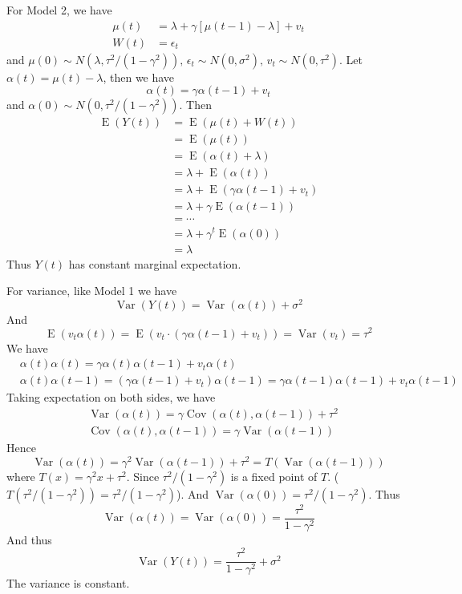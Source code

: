 \documentclass{article}
\DeclareMathOperator{\Cov}{Cov}
\DeclareMathOperator{\Var}{Var}
\DeclareMathOperator{\E}{E}
\begin{document}
\begin{enumerate}
    For Model 2, we have
	\begin{align*}
	\mu(t) & = \lambda + \gamma[\mu(t-1) - \lambda] + v_t\\
	W(t) & = \epsilon_t
	\end{align*}
	and $\mu(0) \sim N(\lambda, \tau^2/(1 - \gamma^2)),\, \epsilon_t \sim N(0, \sigma^2),\, v_t \sim N(0, \tau^2)$.
	Let $\alpha(t) = \mu(t) - \lambda$, then we have
	\[\alpha(t) = \gamma \alpha(t-1) + v_t\]
	and $\alpha(0) \sim N(0, \tau^2/(1 - \gamma^2))$. Then
	\begin{align*}
	\E(Y(t)) & = \E(\mu(t) + W(t))\\
	& = \E(\mu(t))\\
	& = \E(\alpha(t) + \lambda)\\
	& = \lambda + \E(\alpha(t))\\
	& = \lambda + \E(\gamma \alpha(t-1) + v_t)\\
	& = \lambda + \gamma\E(\alpha(t-1))\\
	& = \cdots\\
	& = \lambda + \gamma^t \E(\alpha(0))\\
	& = \lambda 
	\end{align*}
	Thus $Y(t)$ has constant marginal expectation.

	For variance, like Model 1 we have
	\[\Var(Y(t)) = \Var(\alpha(t)) + \sigma^2\]
	And
	\[\E(v_t \alpha(t)) = \E(v_t \cdot (\gamma \alpha(t-1) + v_t)) = \Var(v_t) = \tau^2\]
	We have
	\begin{align*}
	&\alpha(t) \alpha(t) = \gamma \alpha(t) \alpha(t-1) + v_t \alpha(t)\\
	& \alpha(t) \alpha(t-1) = (\gamma \alpha(t-1) + v_t) \alpha(t-1) = \gamma \alpha(t-1) \alpha(t-1) + v_t \alpha(t-1)
	\end{align*}
	Taking expectation on both sides, we have
	\begin{align*}
	& \Var(\alpha(t)) = \gamma \Cov(\alpha(t), \alpha(t-1)) + \tau^2\\
	& \Cov(\alpha(t), \alpha(t-1)) = \gamma \Var(\alpha(t-1))
	\end{align*}
	Hence
	\[\Var(\alpha(t)) = \gamma^2 \Var(\alpha(t-1)) + \tau^2 = T\left(\Var(\alpha(t-1))\right)\]
	where $T(x) = \gamma^2 x + \tau^2$. Since $\tau^2/(1 - \gamma^2)$ is a fixed point of $T$. ($T\left(\tau^2/(1 - \gamma^2)\right) = \tau^2/(1 - \gamma^2)$). And $\Var(\alpha(0)) = \tau^2/(1 - \gamma^2)$. Thus
	\[\Var(\alpha(t)) = \Var(\alpha(0)) = \frac{\tau^2}{1 - \gamma^2}\]
	And thus
	\[\Var(Y(t)) = \frac{\tau^2}{1 - \gamma^2} + \sigma^2\]
	The variance is constant.


\end{enumerate}
\end{document}
